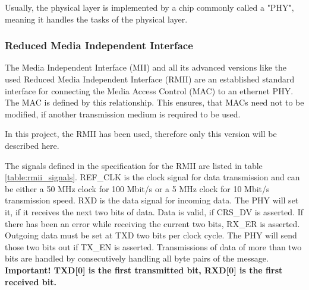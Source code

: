 Usually, the physical layer is implemented by a chip commonly called a "PHY", meaning it handles the tasks of the physical layer.

\subsubsection{Reduced Media Independent Interface}
The Media Independent Interface (MII) and all its advanced versions like the used Reduced Media Independent Interface (RMII) are an established standard interface for connecting the Media Access Control (MAC) to an ethernet PHY. The MAC is defined by this relationship. This ensures, that MACs need not to be modified, if another transmission medium is required to be used.

In this project, the RMII has been used, therefore only this version will be described here.

The signals defined in the specification for the RMII are listed in table \ref{table:rmii_signals}. REF\_CLK is the clock signal for data transmission and can be either a 50 MHz clock for 100 Mbit/s or a 5 MHz clock for 10 Mbit/s transmission speed. RXD is the data signal for incoming data. The PHY will set it, if it receives the next two bits of data. Data is valid, if CRS\_DV is asserted. If there has been an error while receiving the current two bits, RX\_ER is asserted. Outgoing data must be set at TXD two bits per clock cycle. The PHY will send those two bits out if TX\_EN is asserted. Transmissions of data of more than two bits are handled by consecutively handling all byte pairs of the message. \textbf{Important! TXD[0] is the first transmitted bit, RXD[0] is the first received bit.}

